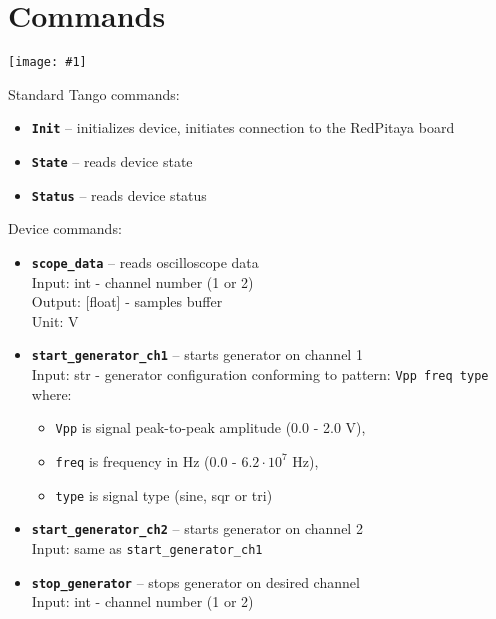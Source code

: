 \documentclass[12pt,a4paper]{article}
\newcommand{\screenshot}[1]{\begin{minipage}[c]{\textwidth}\texttt{[image: \#1]}\end{minipage}}
\begin{document}
	\section{Commands}
	\screenshot{screenshots/commands.png}
	Standard Tango commands:
	\begin{itemize}
		\item \textbf{\texttt{Init}} -- initializes device, initiates connection to the RedPitaya board
		\item \textbf{\texttt{State}} -- reads device state
		\item \textbf{\texttt{Status}} -- reads device status
	\end{itemize}
	Device commands:
	\begin{itemize}
		\item \textbf{\texttt{scope\_data}} -- reads oscilloscope data\\
			  Input: int - channel number (1 or 2)\\
			  Output: [float] - samples buffer\\
			  Unit: V\\
		\item \textbf{\texttt{start\_generator\_ch1}} -- starts generator on channel 1\\
			  Input: str - generator configuration conforming to pattern: \texttt{Vpp~freq~type}\\
			  where:
			  \begin{itemize}
			  	\item \texttt{Vpp} is signal peak-to-peak amplitude (0.0 - 2.0 V),
			  	\item \texttt{freq} is frequency in Hz (0.0 - $6.2\cdot10^7$ Hz),
			  	\item \texttt{type} is signal type (sine, sqr or tri)
			  \end{itemize}
		\item \textbf{\texttt{start\_generator\_ch2}} -- starts generator on channel 2\\
			  Input: same as \texttt{start\_generator\_ch1}
		\item \textbf{\texttt{stop\_generator}} -- stops generator on desired channel\\
			  Input: int - channel number (1 or 2)
	\end{itemize}
\end{document}
